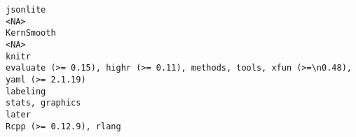 \documentclass[
  letterpaper,
  DIV=11,
  numbers=noendperiod]{scrreprt}
\begin{document}
\begin{verbatim}
jsonlite                                                                                                                                                                                                                                                                                                                                                                                                                                                                                                                                                                                                              <NA>
KernSmooth                                                                                                                                                                                                                                                                                                                                                                                                                                                                                                                                                                                                            <NA>
knitr                                                                                                                                                                                                                                                                                                                                                                                                                                                                                                                               evaluate (>= 0.15), highr (>= 0.11), methods, tools, xfun (>=\n0.48), yaml (>= 2.1.19)
labeling                                                                                                                                                                                                                                                                                                                                                                                                                                                                                                                                                                                                   stats, graphics
later                                                                                                                                                                                                                                                                                                                                                                                                                                                                                                                                                                                              Rcpp (>= 0.12.9), rlang

\end{verbatim}
\end{document}
